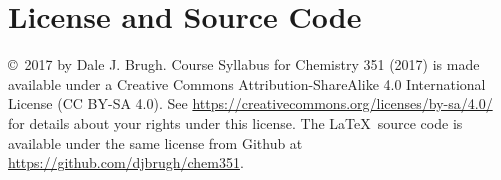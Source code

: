 \documentclass[letterpaper,oneside,onecolumn,11pt,article]{memoir}
\begin{document}
\section{License and Source Code}
\copyright\ 2017 by Dale J. Brugh. Course Syllabus for Chemistry 351 (2017) is made available under a Creative Commons Attribution-ShareAlike 4.0 International License (CC BY-SA 4.0). See \href{https://creativecommons.org/licenses/by-sa/4.0/}{https://creativecommons.org/licenses/by-sa/4.0/} for details about your rights under this license. The \LaTeX\ source code is available under the same license from Github at \href{https://github.com/djbrugh/chem351}{https://github.com/djbrugh/chem351}. 
\end{document}
